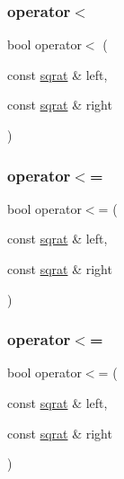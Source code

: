 \mbox{\label{classsqrat_a1326bc7564a14f2fa4cbe59cdcf94b69}} 
\subsubsection{\texorpdfstring{operator$<$}{operator<}\hspace{0.1cm}{\footnotesize\ttfamily [3/3]}}
{\footnotesize\ttfamily bool operator$<$ (\begin{DoxyParamCaption}\item[{const \mbox{\hyperlink{classsqrat}{sqrat}} \&}]{left,  }\item[{const \mbox{\hyperlink{classsqrat}{sqrat}} \&}]{right }\end{DoxyParamCaption})\hspace{0.3cm}{\ttfamily [friend]}}

\mbox{\label{classsqrat_ae33aee8490a3137fb967fbd52b100f6d}} 
\subsubsection{\texorpdfstring{operator$<$=}{operator<=}\hspace{0.1cm}{\footnotesize\ttfamily [1/3]}}
{\footnotesize\ttfamily bool operator$<$= (\begin{DoxyParamCaption}\item[{const \mbox{\hyperlink{classsqrat}{sqrat}} \&}]{left,  }\item[{const \mbox{\hyperlink{classsqrat}{sqrat}} \&}]{right }\end{DoxyParamCaption})\hspace{0.3cm}{\ttfamily [friend]}}

\mbox{\label{classsqrat_ae33aee8490a3137fb967fbd52b100f6d}} 
\subsubsection{\texorpdfstring{operator$<$=}{operator<=}\hspace{0.1cm}{\footnotesize\ttfamily [2/3]}}
{\footnotesize\ttfamily bool operator$<$= (\begin{DoxyParamCaption}\item[{const \mbox{\hyperlink{classsqrat}{sqrat}} \&}]{left,  }\item[{const \mbox{\hyperlink{classsqrat}{sqrat}} \&}]{right }\end{DoxyParamCaption})\hspace{0.3cm}{\ttfamily [friend]}}

